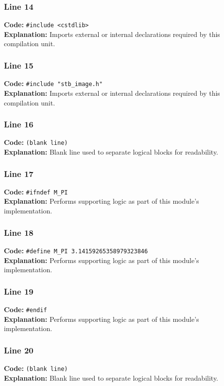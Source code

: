 \documentclass[11pt,a4paper]{article}
\begin{document}
\subsubsection*{Line 14}
\textbf{Code:} \verb|#include <cstdlib>|\\
\textbf{Explanation:} Imports external or internal declarations required by this compilation unit.

\subsubsection*{Line 15}
\textbf{Code:} \verb|#include "stb_image.h"|\\
\textbf{Explanation:} Imports external or internal declarations required by this compilation unit.

\subsubsection*{Line 16}
\textbf{Code:} \texttt{(blank line)}\\
\textbf{Explanation:} Blank line used to separate logical blocks for readability.

\subsubsection*{Line 17}
\textbf{Code:} \verb|#ifndef M_PI|\\
\textbf{Explanation:} Performs supporting logic as part of this module's implementation.

\subsubsection*{Line 18}
\textbf{Code:} \verb|#define M_PI 3.14159265358979323846|\\
\textbf{Explanation:} Performs supporting logic as part of this module's implementation.

\subsubsection*{Line 19}
\textbf{Code:} \verb|#endif|\\
\textbf{Explanation:} Performs supporting logic as part of this module's implementation.

\subsubsection*{Line 20}
\textbf{Code:} \texttt{(blank line)}\\
\textbf{Explanation:} Blank line used to separate logical blocks for readability.
\end{document}
